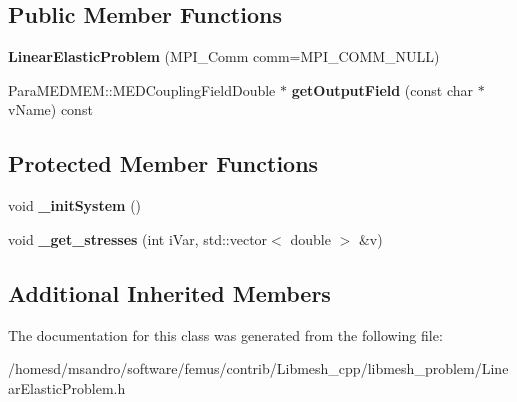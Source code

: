 \subsection*{Public Member Functions}
\begin{DoxyCompactItemize}
\item 
\hypertarget{class_linear_elastic_problem_a7ab0868a3958a95308efc3fb60ce6484}{{\bfseries Linear\-Elastic\-Problem} (M\-P\-I\-\_\-\-Comm comm=M\-P\-I\-\_\-\-C\-O\-M\-M\-\_\-\-N\-U\-L\-L)}\label{class_linear_elastic_problem_a7ab0868a3958a95308efc3fb60ce6484}

\item 
\hypertarget{class_linear_elastic_problem_a51c3ca5ecd1279d797c81ea00adc0005}{Para\-M\-E\-D\-M\-E\-M\-::\-M\-E\-D\-Coupling\-Field\-Double $\ast$ {\bfseries get\-Output\-Field} (const char $\ast$v\-Name) const }\label{class_linear_elastic_problem_a51c3ca5ecd1279d797c81ea00adc0005}

\end{DoxyCompactItemize}
\subsection*{Protected Member Functions}
\begin{DoxyCompactItemize}
\item 
\hypertarget{class_linear_elastic_problem_a9fcc48fd002d9d7d48ff91c8e9d5acd9}{void {\bfseries \-\_\-init\-System} ()}\label{class_linear_elastic_problem_a9fcc48fd002d9d7d48ff91c8e9d5acd9}

\item 
\hypertarget{class_linear_elastic_problem_a098b7d34a0808f7f6c4d76292d86a0d0}{void {\bfseries \-\_\-get\-\_\-stresses} (int i\-Var, std\-::vector$<$ double $>$ \&v)}\label{class_linear_elastic_problem_a098b7d34a0808f7f6c4d76292d86a0d0}

\end{DoxyCompactItemize}
\subsection*{Additional Inherited Members}


The documentation for this class was generated from the following file\-:\begin{DoxyCompactItemize}
\item 
/homesd/msandro/software/femus/contrib/\-Libmesh\-\_\-cpp/libmesh\-\_\-problem/Linear\-Elastic\-Problem.\-h\end{DoxyCompactItemize}
